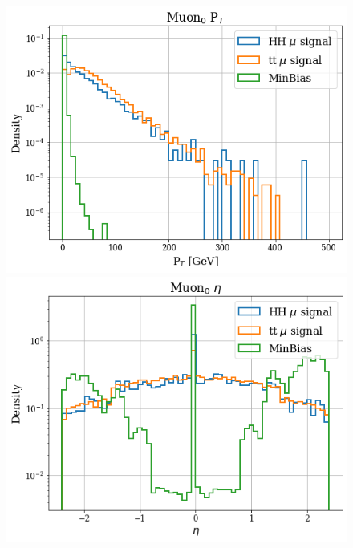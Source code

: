 \documentclass[../main.tex]{subfiles}
\begin{document}
\begin{figure}[h]
  \begin{minipage}[b]{0.33\linewidth}
    \centering
    \includegraphics[width=1\linewidth]{Chapters/Plots/Hist_1mu_muon0_Pt.png}
  \end{minipage}%
  \begin{minipage}[b]{0.33\linewidth}
    \centering
    \includegraphics[width=1\linewidth]{Chapters/Plots/Hist_1mu_muon0_Eta.png}
  \end{minipage} %
  \begin{minipage}[b]{0.33\linewidth}

\end{minipage}
\end{figure}
\end{document}
